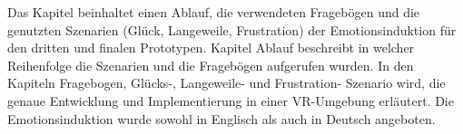 

Das Kapitel beinhaltet einen Ablauf, die verwendeten Fragebögen und die genutzten Szenarien (Glück, Langeweile, Frustration) der Emotionsinduktion für den dritten und finalen Prototypen. 
Kapitel Ablauf beschreibt in welcher Reihenfolge die Szenarien und die Fragebögen aufgerufen wurden. 
In den Kapiteln Fragebogen, Glücks-, Langeweile- und Frustration- Szenario wird, die genaue Entwicklung und Implementierung in einer VR-Umgebung erläutert.
Die Emotionsinduktion wurde sowohl in Englisch als auch in Deutsch angeboten.






